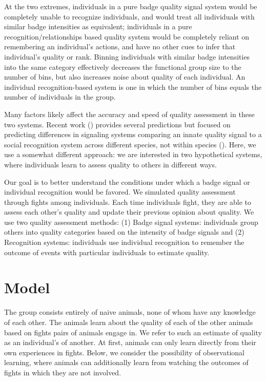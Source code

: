 At the two extremes, individuals in a pure badge quality signal system would be completely unable to recognize individuals, and would treat all individuals with similar badge intensities as equivalent; individuals in a pure recognition/relationships based quality system would be completely reliant on remembering an individual's actions, and have no other cues to infer that individual's quality or rank. Binning individuals with similar badge intensities into the same category effectively decreases the functional group size to the number of bins, but also increases noise about quality of each individual. An individual recognition-based system is one in which the number of bins equals the number of individuals in the group.  

Many factors likely affect the accuracy and speed of quality assessment in these two systems. Recent work (\cite{sheehan2016evotradeoff}) provides several predictions but focused on predicting differences in signaling systems comparing an innate quality signal to a social recognition system across different species, not within species (\cite{sheehan2016response}). Here, we use a somewhat different approach: we are interested in two hypothetical systems, where individuals learn to assess quality to others in different ways. 

Our goal is to better understand the conditions under which a badge signal or individual recognition would be favored. We simulated quality assessment through fights among individuals. Each time individuals fight, they are able to assess each other's quality and update their previous opinion about quality. We use two quality assessment methods: (1) Badge signal systems: individuals group others into quality categories based on the intensity of badge signals and (2) Recognition systems: individuals use individual recognition to remember the outcome of events with particular individuals to estimate quality. 

\section*{Model} 


The group consists entirely of naive animals, none of whom have any knowledge of each other. The animals learn about the quality of each of the other animals based on fights pairs of animals engage in. We refer to such an estimate of quality as an individual's  of another. At first, animals can only learn directly from their own experiences in fights. Below, we consider the possibility of observational learning, where animals can additionally learn from watching the outcomes of fights in which they are not involved. 


